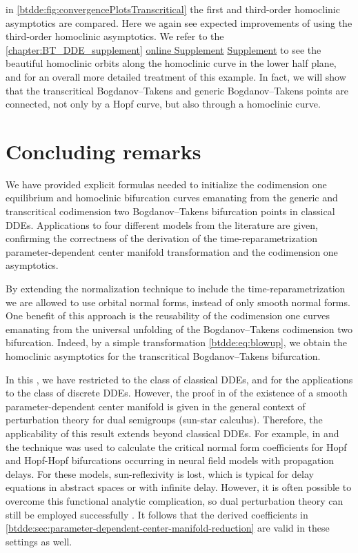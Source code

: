 in \cref{btdde:fig:convergencePlotsTranscritical} the first and third-order
homoclinic asymptotics are compared. Here we again see expected improvements of using the
third-order homoclinic asymptotics. We refer to the
\ifthesis%
    \cref{chapter:BT_DDE_supplement} %
\fi%
\ifsiam%
    \hyperref[mysupplement]{online Supplement} %
\fi%
\ifarxiv%
    \hyperlink{mysupplement}{Supplement} %
\fi to see the beautiful
homoclinic orbits along the homoclinic curve in the lower half plane, and for
an overall more detailed treatment of this example. In fact, we will show that
the transcritical Bogdanov--Takens and generic Bogdanov--Takens points are
connected, not only by a Hopf curve, but also through a homoclinic curve. 

\section{Concluding remarks}
We have provided explicit formulas needed to initialize the codimension one
equilibrium and homoclinic bifurcation curves emanating from the generic and transcritical codimension two Bogdanov--Takens bifurcation points in classical
DDEs. Applications to four different models from the literature are given, confirming the
correctness of the derivation of the time-reparametrization
parameter-dependent
center manifold transformation and the codimension one asymptotics.

By extending the normalization technique to include the time-reparametrization we
are allowed to use orbital normal forms, instead of only smooth normal forms.
One benefit of this approach is the reusability of the codimension one curves
emanating from the universal unfolding of the Bogdanov--Takens codimension two
bifurcation. Indeed, by a simple transformation \cref{btdde:eq:blowup}, we obtain the
homoclinic asymptotics for the transcritical Bogdanov--Takens bifurcation.

In this \paper{}, we have restricted to the class of classical DDEs, and for the
applications to the class of discrete DDEs. However, the proof in
\cite{Switching2019} of the existence of a smooth parameter-dependent center
manifold is given in the general context of perturbation theory for dual
semigroups (sun-star calculus). Therefore, the applicability of this result
extends beyond classical DDEs. For example, in \cite{VanGils2013} and
\cite{Dijkstra2015} the technique was used to calculate the critical normal
form coefficients for Hopf and Hopf-Hopf bifurcations occurring in neural field
models with propagation delays. For these models, sun-reflexivity is lost, which
is typical for delay equations in abstract spaces or with infinite delay.
However, it is often possible to overcome this functional analytic
complication, so dual perturbation theory can still be employed successfully
\cite{Diekmann2008,Diekmann2012blending,VanGils2013,Janssens2019}. It follows
that the derived coefficients in
\cref{btdde:sec:parameter-dependent-center-manifold-reduction} are valid in these
settings as well.


